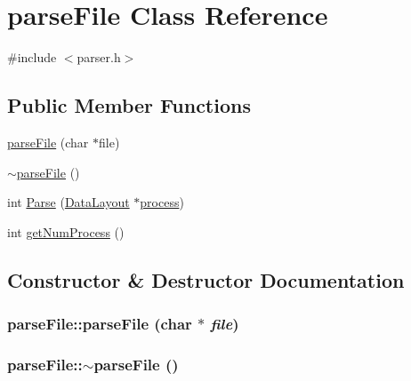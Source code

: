 \hypertarget{classparseFile}{
\section{parseFile Class Reference}
\label{classparseFile}
}


{\ttfamily \#include $<$parser.h$>$}

\subsection*{Public Member Functions}
\begin{DoxyCompactItemize}
\item 
\hyperlink{classparseFile_a54a7a47bb639dd47ad3b35a209f57714}{parseFile} (char $\ast$file)
\item 
\hyperlink{classparseFile_a5876a9f95389b4fec59a99d8e100ac4e}{$\sim$parseFile} ()
\item 
int \hyperlink{classparseFile_acec3556d26009bf290b04b634d69c464}{Parse} (\hyperlink{structDataLayout}{DataLayout} $\ast$\hyperlink{TCP__RTAI__node_8cpp_a1a4bae40ef1525e4c92639024e3b67ef}{process})
\item 
int \hyperlink{classparseFile_a0beaa689666f13d6abbd6a3957e62061}{getNumProcess} ()
\end{DoxyCompactItemize}


\subsection{Constructor \& Destructor Documentation}
\hypertarget{classparseFile_a54a7a47bb639dd47ad3b35a209f57714}{
\subsubsection[{parseFile}]{\setlength{\rightskip}{0pt plus 5cm}parseFile::parseFile (char $\ast$ {\em file})}}
\label{classparseFile_a54a7a47bb639dd47ad3b35a209f57714}
\hypertarget{classparseFile_a5876a9f95389b4fec59a99d8e100ac4e}{
\subsubsection[{$\sim$parseFile}]{\setlength{\rightskip}{0pt plus 5cm}parseFile::$\sim$parseFile ()}}
\label{classparseFile_a5876a9f95389b4fec59a99d8e100ac4e}


